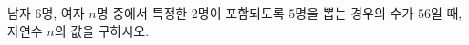 \hspace*{2mm}\begin{minipage}[t]{\dimexpr\linewidth-2mm\relax}\vspace{0pt}
남자 $6$명, 여자 $n$명 중에서 특정한 $2$명이 포함되도록 $5$명을 뽑는 경우의 수가 $56$일 때, 자연수 $n$의 값을 구하시오.\end{minipage}
